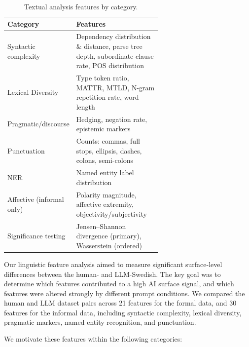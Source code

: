 \documentclass[thesis]{cluu}
\begin{document}
\begin{table}[H]
\centering
\setlength{\tabcolsep}{4pt}
\renewcommand{\arraystretch}{1.05}
\caption{Textual analysis features by category.}
\label{tab:textual-analysis-features}
\begin{tabular}{lp{0.62\linewidth}}
\toprule
\textbf{Category} & \textbf{Features} \\
\midrule
Syntactic complexity & Dependency distribution \& distance, parse tree depth, subordinate-clause rate, POS distribution \\
Lexical Diversity     & Type token ratio, MATTR, MTLD, N-gram repetition rate, word length \\
Pragmatic/discourse  & Hedging, negation rate, epistemic markers \\
Punctuation         & Counts: commas, full stops, ellipsis, dashes, colons, semi-colons \\
NER                  & Named entity label distribution \\
Affective (informal only)           & Polarity magnitude, affective extremity, objectivity/subjectivity \\
Significance testing   & Jensen--Shannon divergence (primary), Wasserstein (ordered) \\
\bottomrule
\end{tabular}
\end{table}

Our linguistic feature analysis aimed to measure significant surface-level differences between the human- and LLM-Swedish. The key goal was to determine which features contributed to a high AI surface signal, and which features were altered strongly by different prompt conditions. We compared the human and LLM dataset pairs across 21 features for the formal data, and 30 features for the informal data, including syntactic complexity, lexical diversity, pragmatic markers, named entity recognition, and punctuation.

We motivate these features within the following categories:
\end{document}
